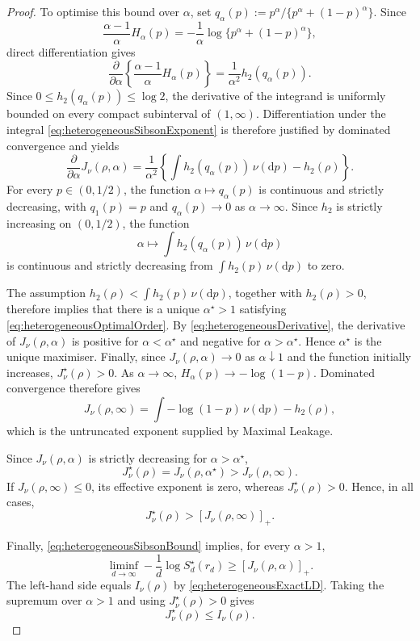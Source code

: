 \documentclass[11pt]{article}
\theoremstyle{definition}
\theoremstyle{remark}
\newcommand{\1}{\boldsymbol{1}}
\begin{document}
\begin{proof}
To optimise this bound over \(\alpha\), set
\(q_\alpha(p):=
p^\alpha/\{p^\alpha+(1-p)^\alpha\}\). Since
\[
\frac{\alpha-1}{\alpha}H_\alpha(p)
=
-\frac1\alpha
\log\{p^\alpha+(1-p)^\alpha\},
\]
direct differentiation gives
\[
\frac{\partial}{\partial\alpha}
\left\{
\frac{\alpha-1}{\alpha}H_\alpha(p)
\right\}
=
\frac1{\alpha^2}h_2(q_\alpha(p)).
\]
Since \(0\le h_2(q_\alpha(p))\le\log2\), the derivative of the
integrand is uniformly bounded on every compact subinterval of
\((1,\infty)\). Differentiation under the integral \eqref{eq:heterogeneousSibsonExponent}  is therefore
justified by dominated convergence and yields
\begin{equation}
\frac{\partial}{\partial\alpha}J_\nu(\rho,\alpha)
=
\frac1{\alpha^2}
\left\{
\int h_2(q_\alpha(p))\,\nu(\mathrm dp)-h_2(\rho)
\right\}.
\label{eq:heterogeneousDerivative}
\end{equation}
For every \(p\in(0,1/2)\), the function
\(\alpha\mapsto q_\alpha(p)\) is continuous and strictly decreasing,
with \(q_1(p)=p\) and \(q_\alpha(p)\to0\) as
\(\alpha\to\infty\). Since \(h_2\) is strictly increasing on
\((0,1/2)\), the function
\[
\alpha\longmapsto
\int h_2(q_\alpha(p))\,\nu(\mathrm dp)
\]
is continuous and strictly decreasing from
\(\int h_2(p)\,\nu(\mathrm dp)\) to zero.

The assumption
\(h_2(\rho)<\int h_2(p)\,\nu(\mathrm dp)\), together with
\(h_2(\rho)>0\), therefore implies that there is a unique
\(\alpha^\star>1\) satisfying
\eqref{eq:heterogeneousOptimalOrder}. By
\eqref{eq:heterogeneousDerivative}, the derivative of
\(J_\nu(\rho,\alpha)\) is positive for
\(\alpha<\alpha^\star\) and negative for
\(\alpha>\alpha^\star\). Hence \(\alpha^\star\) is the unique maximiser.
Finally, since \(J_\nu(\rho,\alpha)\to0\) as \(\alpha\downarrow1\) and
the function initially increases, \(J_\nu^\star(\rho)>0\).
As \(\alpha\to\infty\),
\(H_\alpha(p)\to-\log(1-p)\). Dominated convergence therefore gives
\[
J_\nu(\rho,\infty)
=
\int-\log(1-p)\,\nu(\mathrm dp)-h_2(\rho),
\]
which is the untruncated exponent supplied by Maximal Leakage.

Since \(J_\nu(\rho,\alpha)\) is strictly decreasing for
\(\alpha>\alpha^\star\),
\[
J_\nu^\star(\rho)
=
J_\nu(\rho,\alpha^\star)
>
J_\nu(\rho,\infty).
\]
If \(J_\nu(\rho,\infty)\le0\), its effective exponent is zero, whereas
\(J_\nu^\star(\rho)>0\). Hence, in all cases,
\[
J_\nu^\star(\rho)
>
[J_\nu(\rho,\infty)]_+.
\]

Finally, \eqref{eq:heterogeneousSibsonBound} implies, for every
\(\alpha>1\),
\[
\liminf_{d\to\infty}
-\frac1d\log S_d^\star(r_d)
\ge
[J_\nu(\rho,\alpha)]_+.
\]
The left-hand side equals \(I_\nu(\rho)\) by
\eqref{eq:heterogeneousExactLD}. Taking the supremum over \(\alpha>1\)
and using \(J_\nu^\star(\rho)>0\) gives
\[
J_\nu^\star(\rho)\le I_\nu(\rho).
\]
\end{proof}
\end{document}
